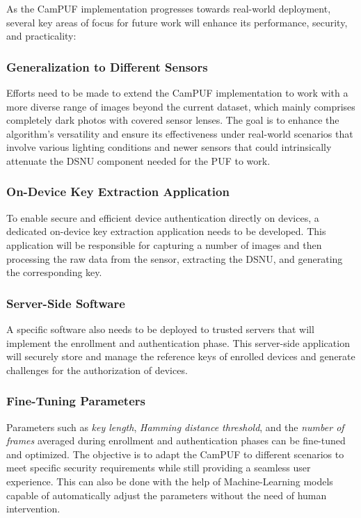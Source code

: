 As the CamPUF implementation progresses towards real-world deployment, several key areas of focus for future work will enhance its performance, security, and practicality:

\subsubsection{Generalization to Different Sensors}

Efforts need to be made to extend the CamPUF implementation to work with a more diverse range of images beyond the current dataset, which mainly comprises completely dark photos with covered sensor lenses. The goal is to enhance the algorithm's versatility and ensure its effectiveness under real-world scenarios that involve various lighting conditions and newer sensors that could intrinsically attenuate the DSNU component needed for the PUF to work.

\subsubsection{On-Device Key Extraction Application}

To enable secure and efficient device authentication directly on devices, a dedicated on-device key extraction application needs to be developed. This application will be responsible for capturing a number of images and then processing the raw data from the sensor, extracting the DSNU, and generating the corresponding key.

\subsubsection{Server-Side Software}

A specific software also needs to be deployed to trusted servers that will implement the enrollment and authentication phase. This server-side application will securely store and manage the reference keys of enrolled devices and generate challenges for the authorization of devices.

\subsubsection{Fine-Tuning Parameters}

Parameters such as \emph{key length}, \emph{Hamming distance threshold}, and the \emph{number of frames} averaged during enrollment and authentication phases can be fine-tuned and optimized. The objective is to adapt the CamPUF to different scenarios to meet specific security requirements while still providing a seamless user experience. This can also be done with the help of Machine-Learning models capable of automatically adjust the parameters without the need of human intervention.

